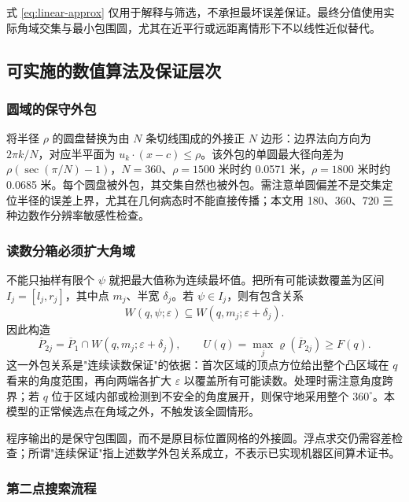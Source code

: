 式 \eqref{eq:linear-approx} 仅用于解释与筛选，不承担最坏误差保证。最终分值使用实际角域交集与最小包围圆，尤其在近平行或远距离情形下不以线性近似替代。

\subsection{可实施的数值算法及保证层次}

\subsubsection{圆域的保守外包}

将半径 $\rho$ 的圆盘替换为由 $N$ 条切线围成的外接正 $N$ 边形：边界法向方向为 $2\pi k/N$，对应半平面为 $u_k\cdot(x-c)\le\rho$。该外包的单圆最大径向差为 $\rho(\sec(\pi/N)-1)$，$N=360$、$\rho=1500$ 米时约 0.0571 米，$\rho=1800$ 米时约 0.0685 米。每个圆盘被外包，其交集自然也被外包。需注意单圆偏差不是交集定位半径的误差上界，尤其在几何病态时不能直接传播；本文用 180、360、720 三种边数作分辨率敏感性检查。

\subsubsection{读数分箱必须扩大角域}

不能只抽样有限个 $\psi$ 就把最大值称为连续最坏值。把所有可能读数覆盖为区间 $I_j=[l_j,r_j]$，其中点 $m_j$、半宽 $\delta_j$。若 $\psi\in I_j$，则有包含关系
\begin{equation}
  W(q,\psi;\varepsilon)\subseteq W(q,m_j;\varepsilon+\delta_j).
\end{equation}
因此构造
\begin{equation}
  \overline{P}_{2j}=\overline{P}_1\cap W(q,m_j;\varepsilon+\delta_j),\qquad
  U(q)=\max_j\varrho(\overline{P}_{2j})\ge F(q).
  \label{eq:U-bound}
\end{equation}
这一外包关系是"连续读数保证"的依据：首次区域的顶点方位给出整个凸区域在 $q$ 看来的角度范围，再向两端各扩大 $\varepsilon$ 以覆盖所有可能读数。处理时需注意角度跨界；若 $q$ 位于区域内部或检测到不安全的角度展开，则保守地采用整个 $360^\circ$。本模型的正常候选点在角域之外，不触发该全圆情形。

程序输出的是保守包围圆，而不是原目标位置网格的外接圆。浮点求交仍需容差检查；所谓"连续保证"指上述数学外包关系成立，不表示已实现机器区间算术证书。

\subsubsection{第二点搜索流程}

